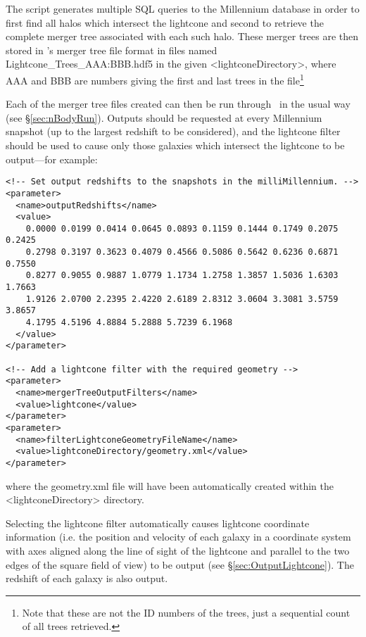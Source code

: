 The script generates multiple SQL queries to the Millennium database in order to first find all halos which intersect the lightcone and second to retrieve the complete merger tree associated with each such halo. These merger trees are then stored in \glc's merger tree file format in files named {\normalfont \ttfamily Lightcone\_Trees\_AAA:BBB.hdf5} in the given {\normalfont \ttfamily \textless lightconeDirectory\textgreater}, where {\normalfont \ttfamily AAA} and {\normalfont \ttfamily BBB} are numbers giving the first and last trees in the file\footnote{Note that these are not the ID numbers of the trees, just a sequential count of all trees retrieved.}

Each of the merger tree files created can then be run through \glc\ in the usual way (see \S\ref{sec:nBodyRun}).  Outputs should be requested at every Millennium snapshot (up to the largest redshift to be considered), and the {\normalfont \ttfamily lightcone} filter should be used to cause only those galaxies which intersect the lightcone to be output---for example:
\begin{verbatim}
<!-- Set output redshifts to the snapshots in the milliMillennium. -->                                                                                                
<parameter>
  <name>outputRedshifts</name>
  <value>
    0.0000 0.0199 0.0414 0.0645 0.0893 0.1159 0.1444 0.1749 0.2075 0.2425
    0.2798 0.3197 0.3623 0.4079 0.4566 0.5086 0.5642 0.6236 0.6871 0.7550
    0.8277 0.9055 0.9887 1.0779 1.1734 1.2758 1.3857 1.5036 1.6303 1.7663
    1.9126 2.0700 2.2395 2.4220 2.6189 2.8312 3.0604 3.3081 3.5759 3.8657
    4.1795 4.5196 4.8884 5.2888 5.7239 6.1968
  </value>
</parameter>

<!-- Add a lightcone filter with the required geometry -->                                                                    
<parameter>
  <name>mergerTreeOutputFilters</name>
  <value>lightcone</value>
</parameter>
<parameter>
  <name>filterLightconeGeometryFileName</name>
  <value>lightconeDirectory/geometry.xml</value>
</parameter>                                                                                                                                                          
\end{verbatim}
where the {\normalfont \ttfamily geometry.xml} file will have been automatically created within the {\normalfont \ttfamily \textless lightconeDirectory\textgreater} directory.

Selecting the lightcone filter automatically causes lightcone coordinate information (i.e. the position and velocity of each galaxy in a coordinate system with axes aligned along the line of sight of the lightcone and parallel to the two edges of the square field of view) to be output (see \S\ref{sec:OutputLightcone}). The redshift of each galaxy is also output.

